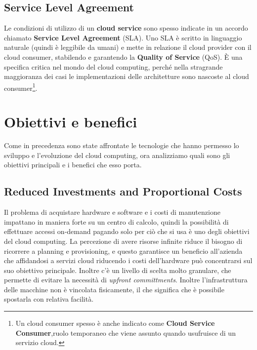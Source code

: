 \subsection{Service Level Agreement}
Le condizioni di utilizzo di un \textbf{cloud service} sono spesso indicate in un accordo chiamato \textbf{Service Level Agreement} (SLA). Uno SLA è scritto in linguaggio naturale (quindi è leggibile da umani) e mette in relazione il cloud provider con il cloud consumer, stabilendo e garantendo la \textbf{Quality of Service} (QoS). È una specifica critica nel mondo del cloud computing, perché nella stragrande maggioranza dei casi le implementazioni delle architetture sono nascoste al cloud consumer\footnote{Un cloud consumer spesso è anche indicato come \textbf{Cloud Service Consumer},ruolo temporaneo che viene assunto quando usufruisce di un servizio cloud.}.
\section{Obiettivi e benefici}
Come in precedenza sono state affrontate le tecnologie che hanno permesso lo sviluppo e l'evoluzione del cloud computing, ora analizziamo quali sono gli obiettivi principali e i benefici che esso porta.
\subsection{Reduced Investments and Proportional Costs}
Il problema di acquistare hardware e software e i costi di manutenzione impattano in maniera forte su un centro di calcolo, quindi la possibilità di effettuare accessi on-demand pagando solo per ciò che si usa è uno degli obiettivi del cloud computing. La percezione di avere risorse infinite riduce il bisogno di ricorrere a planning e provisioning, e questo garantisce un beneficio all'azienda che affidandosi a servizi cloud riducendo i costi dell'hardware può concentrarsi sul suo obiettivo principale.
Inoltre c'è un livello di scelta molto granulare, che permette di evitare la necessità di \textit{upfront committments}. Inoltre l'infrastruttura delle macchine non è vincolata fisicamente, il che significa che è possibile spostarla con relativa facilità.
